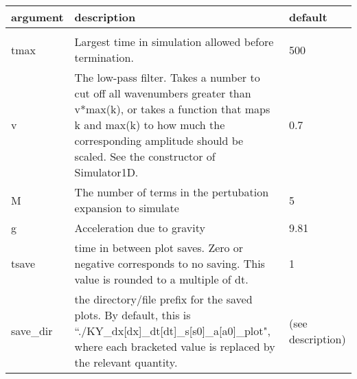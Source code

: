 \documentclass[10pt,a4paper]{article}
\newenvironment{optarglist}
    {\begin{center}
    \begin{tabular}{l|p{10cm}|l}
    argument & description & default\\
    \hline\\
    }
    { 
    \end{tabular} 
    \end{center}
    }
\begin{document}
\begin{optarglist}
    tmax      &   
           Largest time in simulation allowed before termination.&500 \\\hline

    v         & 
           The low-pass filter. Takes a number to cut off all wavenumbers
            greater than v*max(k), or takes a function that maps k and max(k)
            to how much the corresponding amplitude should be scaled. See
            the constructor of Simulator1D.& 0.7 \\\hline
    
    M           &
           The number of terms in the pertubation expansion to simulate& 5\\\hline

    g              &
           Acceleration due to gravity&9.81 \\\hline

    tsave    & 
           time in between plot saves. Zero or negative corresponds to no
            saving. This value is rounded to a multiple of dt.& 1\\\hline
    
    save\_dir     &  
           the directory/file prefix for the saved plots. By default, this is ``./KY\_dx[dx]\_dt[dt]\_s[s0]\_a[a0]\_plot", where each
bracketed value is replaced by the relevant quantity. & (see description)\\\hline
\end{optarglist}
\end{document}
